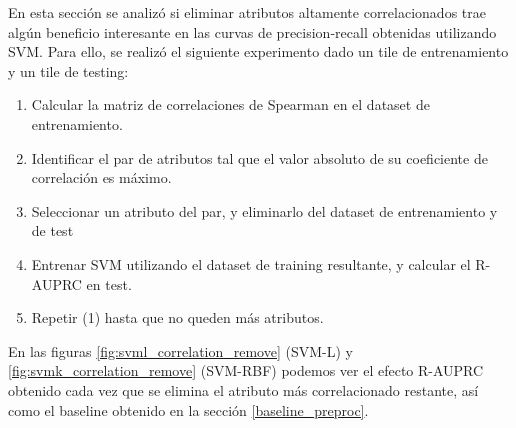 En esta sección se analizó si eliminar atributos altamente correlacionados trae algún beneficio interesante en las curvas de precision-recall obtenidas utilizando SVM. Para ello, se realizó el siguiente experimento dado un tile de entrenamiento y un tile de testing:

\begin{enumerate}
\item Calcular la matriz de correlaciones de Spearman en el dataset de entrenamiento.
\item Identificar el par de atributos tal que el valor absoluto de su coeficiente de correlación es máximo.
\item Seleccionar un atributo del par, y eliminarlo del dataset de entrenamiento y de test
\item Entrenar SVM utilizando el dataset de training resultante, y calcular el R-AUPRC en test.
\item Repetir (1) hasta que no queden más atributos.
\end{enumerate}

En las figuras \ref{fig:svml_correlation_remove} (SVM-L) y \ref{fig:svmk_correlation_remove} (SVM-RBF) podemos ver el efecto R-AUPRC obtenido cada vez que se elimina el atributo más correlacionado restante, así como el baseline obtenido en la sección \ref{baseline_preproc}.

